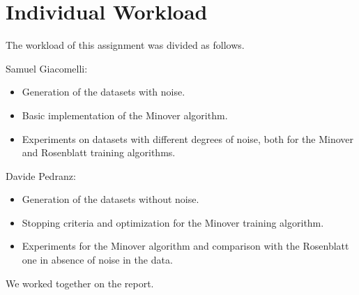 \section{Individual Workload}
The workload of this assignment was divided as follows.

Samuel Giacomelli:
\begin{itemize}
    \item Generation of the datasets with noise.
    \item Basic implementation of the Minover algorithm.
    \item Experiments on datasets with different degrees of noise, both for the Minover and Rosenblatt training algorithms.
\end{itemize}

Davide Pedranz:
\begin{itemize}
    \item Generation of the datasets without noise.
    \item Stopping criteria and optimization for the Minover training algorithm.
    \item Experiments for the Minover algorithm and comparison with the Rosenblatt one in absence of noise in the data.
\end{itemize}

We worked together on the report.
